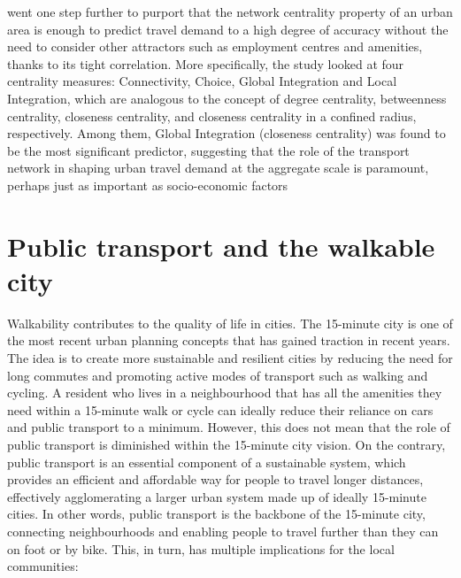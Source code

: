 \cite{jayasingheApplicationDevelopingCountries2017} went one step further to purport that the network centrality property of an urban area is enough to predict travel demand to a high degree of accuracy without the need to consider other attractors such as employment centres and amenities, thanks to its tight correlation. More specifically, the study looked at four centrality measures: Connectivity, Choice, Global Integration and Local Integration, which are analogous to the concept of degree centrality, betweenness centrality, closeness centrality, and closeness centrality in a confined radius, respectively. Among them, Global Integration (closeness centrality) was found to be the most significant predictor, suggesting that the role of the transport network in shaping urban travel demand at the aggregate scale is paramount, perhaps just as important as socio-economic factors \citep{converyDeterminantsTransportMode2019}

\section{Public transport and the walkable city}

Walkability contributes to the quality of life in cities. The 15-minute city is one of the most recent urban planning concepts that has gained traction in recent years. The idea is to create more sustainable and resilient cities by reducing the need for long commutes and promoting active modes of transport such as walking and cycling. A resident who lives in a neighbourhood that has all the amenities they need within a 15-minute walk or cycle can ideally reduce their reliance on cars and public transport to a minimum. However, this does not mean that the role of public transport is diminished within the 15-minute city vision. On the contrary, public transport is an essential component of a sustainable system, which provides an efficient and affordable way for people to travel longer distances, effectively agglomerating a larger urban system made up of ideally 15-minute cities. In other words, public transport is the backbone of the 15-minute city, connecting neighbourhoods and enabling people to travel further than they can on foot or by bike. This, in turn, has multiple implications for the local communities:


